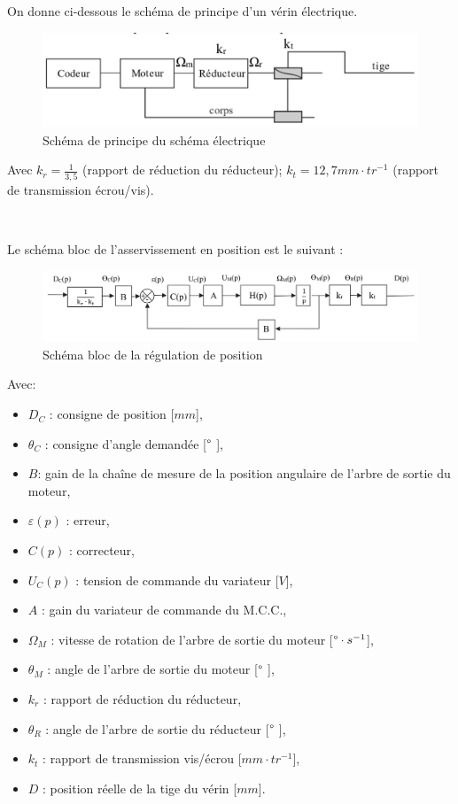 On donne ci-dessous le schéma de principe d’un vérin électrique.

\begin{figure}[!h]
\centering\includegraphics[width=0.7\linewidth]{img/fig22}
 \caption{Schéma de principe du schéma électrique}
 \label{img22}
\end{figure}

Avec $k_r=\frac{1}{3,5}$ (rapport de réduction du réducteur); $k_t=12,7 mm\cdot tr^{-1}$ (rapport de transmission écrou/vis).


~\

Le schéma bloc de l’asservissement en position est le suivant :
\begin{figure}[!h]
\centering\includegraphics[width=0.9\linewidth]{img/fig24}
 \caption{Schéma bloc de la régulation de position}
 \label{img24}
\end{figure}

Avec:
\begin{itemize}
 \item $D_C$ : consigne de position [$mm$],
 \item $\theta_C$ : consigne d’angle demandée [$\degree\ $],
 \item $B$: gain de la chaîne de mesure de la position angulaire de l’arbre de sortie du moteur,
 \item $\varepsilon(p)$ : erreur,
 \item $C(p)$ : correcteur,
 \item $U_C(p)$ : tension de commande du variateur [$V$],
 \item $A$ : gain du variateur de commande du M.C.C.,
 \item $\Omega_M$ : vitesse de rotation de l’arbre de sortie du moteur [$\degree\cdot s^{-1}$],
 \item $\theta_M$ : angle de l’arbre de sortie du moteur [$\degree\ $],
 \item $k_r$ : rapport de réduction du réducteur,
 \item $\theta_R$ : angle de l’arbre de sortie du réducteur [$\degree\ $],
 \item $k_t$ : rapport de transmission vis/écrou [$mm\cdot tr^{-1}$],
 \item $D$ : position réelle de la tige du vérin [$mm$].
\end{itemize}


